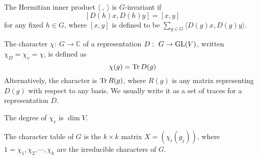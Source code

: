 \documentclass[a4paper]{article}
\begin{document}
\begin{defi}
  The Hermitian inner product $\langle ~,~ \rangle$ is $G$-invariant if
$$[D(h)x,D(h)y]=[x,y]$$
for any fixed $h\in G$, where $[x,y]$ is defined to be $\sum_{g\in G}\langle D(g)x,D(g)y\rangle$.
\end{defi}
\begin{defi}[Character]
  The character $\chi:~G\rightarrow\mathbb{C}$ of a representation $D:~G \to \operatorname{GL}(V)$, written $\chi_D = \chi_v = \chi$, is defined as
$$\chi(g) = \operatorname{Tr} D(g)$$
Alternatively, the character is $\operatorname{Tr} R(g)$, where $R(g)$ is any matrix representing $D(g)$ with respect to any basis. We usually write it as a set of traces for a representation $D$.
\end{defi}
\begin{defi}  The degree of $\chi_v$ is $\dim V$.
\end{defi}
\begin{defi}
  The character table of $G$ is the $k \times k$ matrix $X = (\chi_i (g_j))$, where $1 = \chi_1, \chi_2, \cdots, \chi_k$ are the irreducible characters of $G$.
\end{defi}




\newpage
\end{document}
